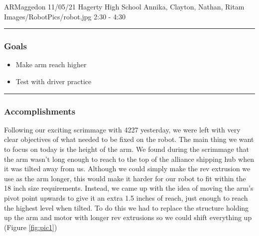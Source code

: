 \insertmeeting 
	{ARMaggedon} 
	{11/05/21}
	{Hagerty High School}
	{Annika, Clayton, Nathan, Ritam}
	{Images/RobotPics/robot.jpg}
	{2:30 - 4:30}
	
\noindent\hfil\rule{\textwidth}{.4pt}\hfil
\subsubsection*{Goals}
\begin{itemize}
    \item Make arm reach higher
    \item Test with driver practice  

\end{itemize} 

\noindent\hfil\rule{\textwidth}{.4pt}\hfil

\subsubsection*{Accomplishments}
Following our exciting scrimmage with 4227 yesterday, we were left with very clear objectives of what needed to be fixed on the robot. The main thing we want to focus on today is the height of the arm. We found during the scrimmage that the arm wasn’t long enough to reach to the top of the alliance shipping hub when it was tilted away from us. Although we could simply make the rev extrusion we use as the arm longer, this would make it harder for our robot to fit within the 18 inch size requirements. Instead, we came up with the idea of moving the arm’s pivot point upwards to give it an extra 1.5 inches of reach, just enough to reach the highest level when tilted. To do this we had to replace the structure holding up the arm and motor with longer rev extrusions so we could shift everything up (Figure \ref{fig:pic1})


